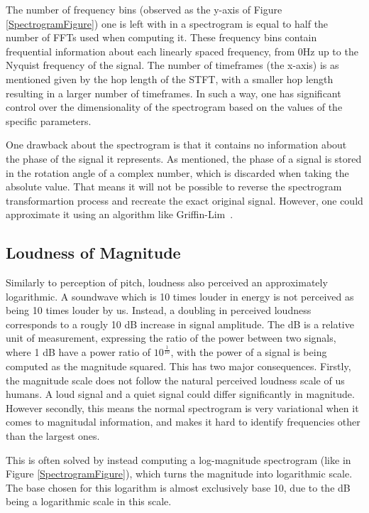 The number of frequency bins (observed as the y-axis of Figure \ref{SpectrogramFigure}) one is left with in a spectrogram is equal to half the number of \glspl{FFT} used when computing it. These frequency bins contain frequential information about each linearly spaced frequency, from 0Hz up to the Nyquist frequency of the signal. The number of timeframes (the x-axis) is as mentioned given by the hop length of the \gls{STFT}, with a smaller hop length resulting in a larger number of timeframes. In such a way, one has significant control over the dimensionality of the spectrogram based on the values of the specific parameters. 

One drawback about the spectrogram is that it contains no information about the phase of the signal it represents. As mentioned, the phase of a signal is stored in the rotation angle of a complex number, which is discarded when taking the absolute value. That means it will not be possible to reverse the spectrogram transformartion process and recreate the exact original signal. However, one could approximate it using an algorithm like Griffin-Lim~\cite{1164317}.

\subsection{Loudness of Magnitude}

Similarly to perception of pitch, loudness also perceived an approximately logarithmic. A soundwave which is 10 times louder in energy is not perceived as being 10 times louder by us. Instead, a doubling in perceived loudness corresponds to a rougly 10 \gls{dB} increase in signal amplitude. The \acrlong{dB} is a relative unit of measurement, expressing the ratio of the power between two signals, where 1 \gls{dB} have a power ratio of $10^\frac{1}{10}$, with the power of a signal is being computed as the magnitude squared. This has two major consequences. Firstly, the magnitude scale does not follow the natural perceived loudness scale of us humans. A loud signal and a quiet signal could differ significantly in magnitude. However secondly, this means the normal spectrogram is very variational when it comes to magnitudal information, and makes it hard to identify frequencies other than the largest ones.

This is often solved by instead computing a log-magnitude spectrogram (like in Figure \ref{SpectrogramFigure}), which turns the magnitude into logarithmic scale. The base chosen for this logarithm is almost exclusively base 10, due to the \acrlong{dB} being a logarithmic scale in this scale.

